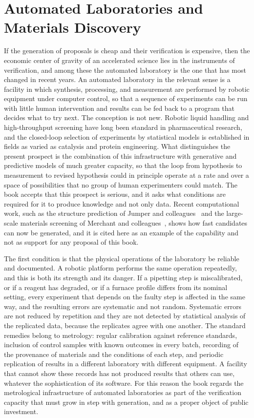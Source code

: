 \chapter{Automated Laboratories and Materials Discovery}
\label{ch:07}

If the generation of proposals is cheap and their verification is expensive, then the economic center of gravity of an accelerated science lies in the instruments of verification, and among these the automated laboratory is the one that has most changed in recent years. An automated laboratory in the relevant sense is a facility in which synthesis, processing, and measurement are performed by robotic equipment under computer control, so that a sequence of experiments can be run with little human intervention and results can be fed back to a program that decides what to try next. The conception is not new. Robotic liquid handling and high-throughput screening have long been standard in pharmaceutical research, and the closed-loop selection of experiments by statistical models is established in fields as varied as catalysis and protein engineering. What distinguishes the present prospect is the combination of this infrastructure with generative and predictive models of much greater capacity, so that the loop from hypothesis to measurement to revised hypothesis could in principle operate at a rate and over a space of possibilities that no group of human experimenters could match. The book accepts that this prospect is serious, and it asks what conditions are required for it to produce knowledge and not only data. Recent computational work, such as the structure prediction of Jumper and colleagues~\cite{jumper2021} and the large-scale materials screening of Merchant and colleagues~\cite{merchant2023}, shows how fast candidates can now be generated, and it is cited here as an example of the capability and not as support for any proposal of this book.

The first condition is that the physical operations of the laboratory be reliable and documented. A robotic platform performs the same operation repeatedly, and this is both its strength and its danger. If a pipetting step is miscalibrated, or if a reagent has degraded, or if a furnace profile differs from its nominal setting, every experiment that depends on the faulty step is affected in the same way, and the resulting errors are systematic and not random. Systematic errors are not reduced by repetition and they are not detected by statistical analysis of the replicated data, because the replicates agree with one another. The standard remedies belong to metrology: regular calibration against reference standards, inclusion of control samples with known outcomes in every batch, recording of the provenance of materials and the conditions of each step, and periodic replication of results in a different laboratory with different equipment. A facility that cannot show these records has not produced results that others can use, whatever the sophistication of its software. For this reason the book regards the metrological infrastructure of automated laboratories as part of the verification capacity that must grow in step with generation, and as a proper object of public investment.

